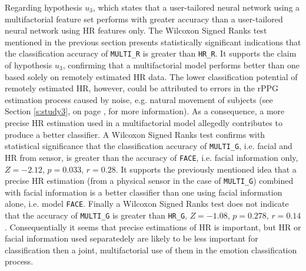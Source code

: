 Regarding hypothesis $u_3$, which states that a user-tailored neural network using a multifactorial feature set performs with greater accuracy than a user-tailored neural network using HR features only. The Wilcoxon Signed Ranks test mentioned in the previous section presents statistically significant indications that the classification accuracy of \texttt{MULTI\_R} is greater than \texttt{HR\_R}. It supports the claim of hypothesis $u_3$, confirming that a multifactorial model performs better than one based solely on remotely estimated HR data. The lower classification potential of remotely estimated HR, however, could be attributed to errors in the rPPG estimation process caused by noise, e.g. natural movement of subjects (see Section \ref{s:study3}, on page \pageref{s:study3}, for more information). As a consequence, a more precise HR estimation used in a multifactorial model allegedly contributes to produce a better classifier. A Wilcoxon Signed Ranks test confirms with statistical significance that the classification accuracy of \texttt{MULTI\_G}, i.e. facial and HR from sensor, is greater than the accuracy of \texttt{FACE}, i.e. facial information only, $Z=-2.12$, $p=0.033$, $r=0.28$. It supports the previously mentioned idea that a precise HR estimation (from a physical sensor in the case of \texttt{MULTI\_G}) combined with facial information is a better classifier than one using facial information alone, i.e. model \texttt{FACE}. Finally a Wilcoxon Signed Ranks test does not indicate that the accuracy of \texttt{MULTI\_G} is greater than \texttt{HR\_G}, $Z=-1.08$, $p=0.278$, $r=0.14$. Consequentially it seems that precise estimations of HR is important, but HR or facial information used separatedely are likely to be less important for classification then a joint, multifactorial use of them in the emotion classification process.

